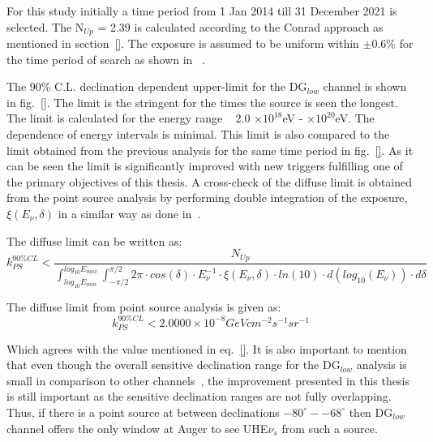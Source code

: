 For this study initially a time period from 1 Jan 2014 till 31 December 2021 is selected. The N$_{Up}$ = 2.39 is calculated according to the Conrad approach as mentioned in section~\ref{}. The exposure is assumed to be uniform within $\pm 0.6\%$ for the time period of search as shown in ~\cite{}. 

The 90\% C.L. declination dependent upper-limit for the DG$_{low}$ channel is shown in fig.~\ref{}. The limit is the stringent for the times the source is seen the longest. The limit is calculated for the energy range ~ 2.0 $\times 10^{18}$eV - $\times 10^{20}$eV. The dependence of energy intervals is minimal. This limit is also compared to the limit obtained from the previous analysis for the same time period in fig.~\ref{}. As it can be seen the limit is significantly improved with new triggers fulfilling one of the primary objectives of this thesis.     
A cross-check of the diffuse limit is obtained from the point source analysis by performing double integration of the exposure, $\xi(E_{\nu}, \delta)$ in a similar way as done in~\cite{}.

The diffuse limit can be written as:
\begin{equation}
  k_{PS}^{90\%CL} < \frac{N_{Up}}{\int_{log_{10}E_{min}}^{log_{10}E_{max}} \int_{-\pi/2}^{\pi/2}2\pi \cdot cos(\delta) \cdot E_{\nu}^{-1} \cdot \xi(E_{\nu}, \delta) \cdot ln(10) \cdot d(log_{10}(E_{\nu})) \cdot d\delta} 
\end{equation}

The diffuse limit from point source analysis is given as: 
\begin{equation}
  k_{PS}^{90\%CL} < 2.0000 \times 10^{-8} GeV cm^{-2} s^{-1} sr^{-1}
\end{equation}

Which agrees with the value mentioned in eq.~\ref{}. It is also important to mention that even though the overall sensitive declination range for the DG$_{low}$ analysis is small in comparison to other channels~\cite{}, the improvement presented in this thesis is still important as the sensitive declination ranges are not fully overlapping. Thus, if there is a point source at between declinations $-80^{\circ}- -68^{\circ}$ then DG$_{low}$ channel offers the only window at Auger to see UHE$\nu_s$ from such a source.  




